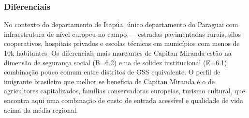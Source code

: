 \subsubsection*{Diferenciais}\label{dif-capitan-miranda-0705}
No contexto do departamento de Itapúa, único departamento do Paraguai com infraestrutura de nível europeu no campo — estradas pavimentadas rurais, silos cooperativos, hospitais privados e escolas técnicas em municípios com menos de 10k habitantes. Os diferenciais mais marcantes de Capitan Miranda estão na dimensão de segurança social (B=6.2) e na de solidez institucional (E=6.1), combinação pouco comum entre distritos de GSS equivalente. O perfil de imigrante brasileiro que melhor se beneficia de Capitan Miranda é o de agricultores capitalizados, famílias conservadoras europeias, turismo cultural, que encontra aqui uma combinação de custo de entrada acessível e qualidade de vida acima da média regional.
